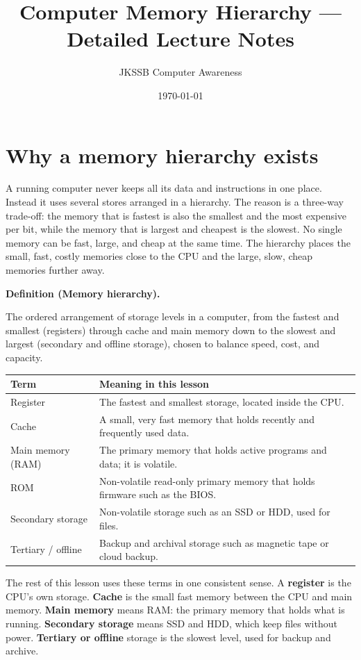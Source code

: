 \documentclass[11pt]{article}
\title{Computer Memory Hierarchy --- Detailed Lecture Notes}
\author{JKSSB Computer Awareness}
\date{\today}
\newenvironment{definitionbox}[1]{%
  \par\noindent\textbf{Definition (#1).}\ \itshape
}{\par\vspace{0.3em}}
\begin{document}
\maketitle

\section{Why a memory hierarchy exists}
A running computer never keeps all its data and instructions in one place.
Instead it uses several stores arranged in a hierarchy. The reason is a
three-way trade-off: the memory that is fastest is also the smallest and the
most expensive per bit, while the memory that is largest and cheapest is the
slowest. No single memory can be fast, large, and cheap at the same time.
The hierarchy places the small, fast, costly memories close to the CPU and
the large, slow, cheap memories further away.

\begin{definitionbox}{Memory hierarchy}
The ordered arrangement of storage levels in a computer, from the fastest
and smallest (registers) through cache and main memory down to the slowest
and largest (secondary and offline storage), chosen to balance speed, cost,
and capacity.
\end{definitionbox}

\begin{center}
\begin{tabular}{p{}p{}}
\toprule
\textbf{Term} & \textbf{Meaning in this lesson} \\
\midrule
Register & The fastest and smallest storage, located inside the CPU. \\
Cache & A small, very fast memory that holds recently and frequently used data. \\
Main memory (RAM) & The primary memory that holds active programs and data; it is volatile. \\
ROM & Non-volatile read-only primary memory that holds firmware such as the BIOS. \\
Secondary storage & Non-volatile storage such as an SSD or HDD, used for files. \\
Tertiary / offline & Backup and archival storage such as magnetic tape or cloud backup. \\
\bottomrule
\end{tabular}
\end{center}

The rest of this lesson uses these terms in one consistent sense. A
\textbf{register} is the CPU's own storage. \textbf{Cache} is the small fast
memory between the CPU and main memory. \textbf{Main memory} means RAM: the
primary memory that holds what is running. \textbf{Secondary storage} means
SSD and HDD, which keep files without power. \textbf{Tertiary or offline}
storage is the slowest level, used for backup and archive.
\end{document}

